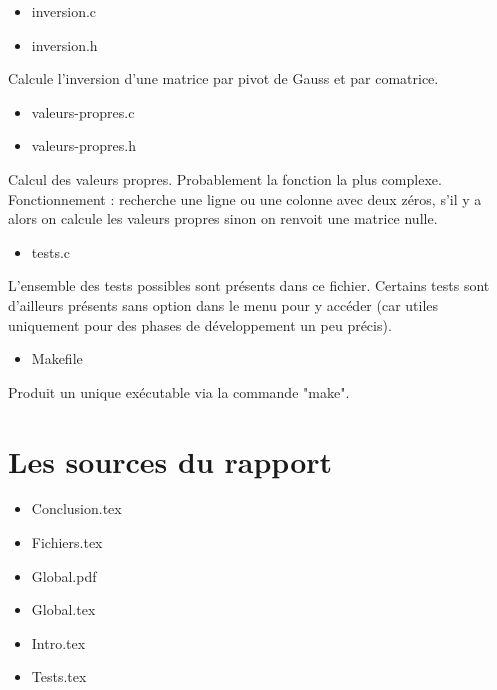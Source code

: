 \begin{itemize}
	\item inversion.c
	\item inversion.h
\end{itemize}
Calcule l'inversion d'une matrice par pivot de Gauss et par comatrice.

\begin{itemize}
	\item valeurs-propres.c
	\item valeurs-propres.h
\end{itemize}
Calcul des valeurs propres.
Probablement la fonction la plus complexe. Fonctionnement : recherche une ligne ou une colonne avec deux zéros, s'il y a alors on calcule les valeurs propres sinon on renvoit une matrice nulle.

\begin{itemize}
	\item tests.c
\end{itemize}
L'ensemble des tests possibles sont présents dans ce fichier.
Certains tests sont d'ailleurs présents sans option dans le menu pour y accéder (car utiles uniquement pour des phases de développement un peu précis).

\begin{itemize}
	\item Makefile
\end{itemize}
Produit un unique exécutable via la commande "make".

\section{Les sources du rapport}


\begin{itemize}
	\item Conclusion.tex
	\item Fichiers.tex
	\item Global.pdf
	\item Global.tex
	\item Intro.tex
	\item Tests.tex
\end{itemize}

\clearpage
